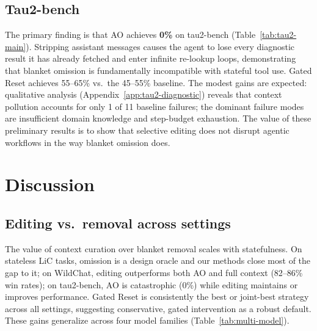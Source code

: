 \documentclass{article}
\begin{document}
\subsection{Tau2-bench}
\label{sec:tau2-results}

The primary finding is that AO achieves \textbf{0\%} on tau2-bench (Table~\ref{tab:tau2-main}). Stripping assistant messages causes the agent to lose every diagnostic result it has already fetched and enter infinite re-lookup loops, demonstrating that blanket omission is fundamentally incompatible with stateful tool use. Gated Reset achieves 55--65\% vs.\ the 45--55\% baseline. The modest gains are expected: qualitative analysis (Appendix~\ref{app:tau2-diagnostic}) reveals that context pollution accounts for only 1 of 11 baseline failures; the dominant failure modes are insufficient domain knowledge and step-budget exhaustion. The value of these preliminary results is to show that selective editing does not disrupt agentic workflows in the way blanket omission does.


\section{Discussion}
\label{sec:discussion}

\subsection{Editing vs.\ removal across settings}

The value of context curation over blanket removal scales with statefulness. On stateless LiC tasks, omission is a design oracle and our methods close most of the gap to it; on WildChat, editing outperforms both AO and full context (82--86\% win rates); on tau2-bench, AO is catastrophic (0\%) while editing maintains or improves performance. Gated Reset is consistently the best or joint-best strategy across all settings, suggesting conservative, gated intervention as a robust default. These gains generalize across four model families (Table~\ref{tab:multi-model}).
\end{document}
